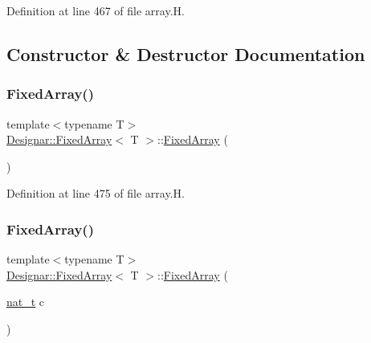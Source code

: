 Definition at line 467 of file array.\+H.



\subsection{Constructor \& Destructor Documentation}
\mbox{\label{class_designar_1_1_fixed_array_a493a48e7c23b6b882a96c5451d10248a}} 
\subsubsection{\texorpdfstring{Fixed\+Array()}{FixedArray()}\hspace{0.1cm}{\footnotesize\ttfamily [1/6]}}
{\footnotesize\ttfamily template$<$typename T$>$ \\
\hyperlink{class_designar_1_1_fixed_array}{Designar\+::\+Fixed\+Array}$<$ T $>$\+::\hyperlink{class_designar_1_1_fixed_array}{Fixed\+Array} (\begin{DoxyParamCaption}{ }\end{DoxyParamCaption})\hspace{0.3cm}{\ttfamily [inline]}}



Definition at line 475 of file array.\+H.

\mbox{\label{class_designar_1_1_fixed_array_ac3bed73485d717ddc1fc412d3e7fea58}} 
\subsubsection{\texorpdfstring{Fixed\+Array()}{FixedArray()}\hspace{0.1cm}{\footnotesize\ttfamily [2/6]}}
{\footnotesize\ttfamily template$<$typename T$>$ \\
\hyperlink{class_designar_1_1_fixed_array}{Designar\+::\+Fixed\+Array}$<$ T $>$\+::\hyperlink{class_designar_1_1_fixed_array}{Fixed\+Array} (\begin{DoxyParamCaption}\item[{\hyperlink{namespace_designar_aa72662848b9f4815e7bf31a7cf3e33d1}{nat\+\_\+t}}]{c }\end{DoxyParamCaption})\hspace{0.3cm}{\ttfamily [inline]}}



